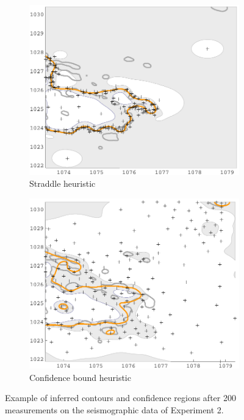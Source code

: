 \documentclass[11pt]{article} %
\begin{document}
\begin{figure}[tb]
  \begin{subfigure}[b]{0.5\textwidth}
    \centering
    \includegraphics[width=\textwidth]{figures/quake_expl_straddle}
    \caption{Straddle heuristic}
  \end{subfigure}
  \hfill
  \begin{subfigure}[b]{0.5\textwidth}
    \centering
    \includegraphics[width=\textwidth]{figures/quake_expl_cb}
    \caption{Confidence bound heuristic}
  \end{subfigure}
  \caption{Example of inferred contours and confidence regions after 200
           measurements on the seismographic data of Experiment 2.}
  \label{fig:quake_expl}
\end{figure}
\end{document}

